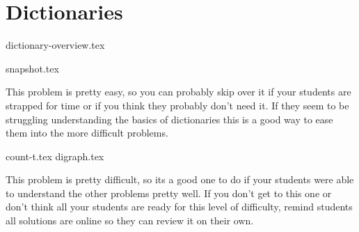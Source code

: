 \documentclass{exam}
\begin{document}
\section{Dictionaries}
{dictionary-overview.tex}
\begin{questions}
    {snapshot.tex}
    \begin{questionmeta}
        This problem is pretty easy, so you can probably skip over it if your students are strapped for time or if you think they probably don't need it. If they seem to be struggling understanding the basics of dictionaries this is a good way to ease them into the more difficult problems.
    \end{questionmeta}
    {count-t.tex}
    {digraph.tex}
    \begin{questionmeta}
        This problem is pretty difficult, so its a good one to do if your students were able to understand the other problems pretty well. If you don't get to this one or don't think all your students are ready for this level of difficulty, remind students all solutions are online so they can review it on their own.
    \end{questionmeta}
\end{questions}
\end{document}
